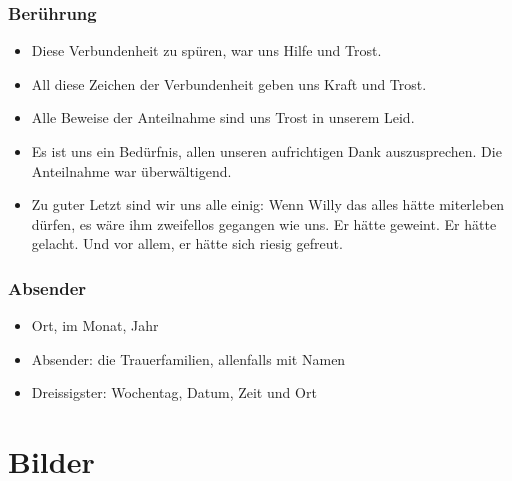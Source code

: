 \documentclass[ngerman,a4paper,11pt]{scrreprt}
\begin{document}
\section{Berührung}
\label{sec-2-1-9}

\begin{itemize}
\item Diese Verbundenheit zu spüren, war uns Hilfe und Trost.
\item All diese Zeichen der Verbundenheit geben uns Kraft und Trost.
\item Alle Beweise der Anteilnahme sind uns Trost in unserem Leid.
\item Es ist uns ein Bedürfnis, allen unseren aufrichtigen Dank
auszusprechen. Die Anteilnahme war überwältigend.
\item Zu guter Letzt sind wir uns alle einig: Wenn Willy das alles hätte
miterleben dürfen, es wäre ihm zweifellos gegangen wie uns. Er hätte
geweint. Er hätte gelacht. Und vor allem, er hätte sich riesig gefreut.
\end{itemize}

\section{Absender}
\label{sec-2-1-10}

\begin{itemize}
\item Ort, im Monat, Jahr
\item Absender: die Trauerfamilien, allenfalls mit Namen
\item Dreissigster: Wochentag, Datum, Zeit und Ort
\end{itemize}

\part{Bilder}
\label{sec-3}
\end{document}
